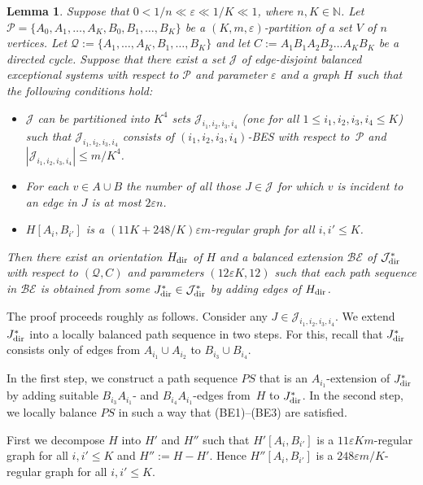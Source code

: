 \documentclass{memo-l}
\newtheorem{lemma}[firstthm]{Lemma}
\def\COMMENT#1{}
\def\proof{\removelastskip\penalty55\medskip\noindent{\bf Proof. }}
\def\cP{\mathcal{P}}
\def\eps{\varepsilon}
\def\i{(i_1,i_2,i_3,i_4)}
\def\I{i_1,i_2,i_3,i_4}
\numberwithin{section}{chapter}
\numberwithin{equation}{section}
\numberwithin{firstthm}{section}
\numberwithin{figure}{section}
\begin{document}
{\begin{lemma}\label{balanceextensionbip}
Suppose that $0<1/n \ll \eps  \ll 1/K \ll 1$,
where $n,K \in \mathbb N$.
Let $\cP=\{A_0,A_1,\dots,A_K,B_0,B_1,\dots,B_K\}$ be a $(K,m,\eps)$-partition of a set $V$ of $n$ vertices.
Let $\mathcal{Q} := \{A_1,\dots,A_K,B_1,\dots,B_K \}$ and let $C:= A_1B_1A_2B_2 \dots A_KB_K$ be a directed cycle. 
Suppose that there exist a set $\mathcal{J}$ of edge-disjoint balanced exceptional systems with respect to $\mathcal{P}$ and parameter $\eps$ and a graph $H$ such that the following conditions hold:
\begin{itemize}
\item[{\rm (i)}]  $\mathcal{J}$ can be partitioned into $K^4$ sets $\mathcal J_{\I}$ (one for all $1\le \I\le K$) such that $\mathcal J_{\I}$
consists of $\i$-BES with respect to~$\cP$ and $|\mathcal J_{\I}| \le m/K^4$.
\item[{\rm (ii)}] For each $v \in A \cup B$ the number of all those $J \in \mathcal{J}$ for which $v$ is incident to an edge in $J$ is at most $2 \eps n $.
\item[{\rm (iii)}] $H[A_{i},B_{i'}]$ is a $(11K+ 248/K)\eps m$-regular graph for all $i,i' \le K$.
\end{itemize}
Then there exist an orientation $H_{{\rm dir}}$ of $H$ and a balanced extension $\mathcal{BE}$ of $\mathcal{J}^*_{\rm dir}$ with respect to $(\mathcal{Q},C)$
and parameters $( 12 \eps K , 12)$ such that each path sequence in $\mathcal{BE}$ is obtained from some $J^*_{\rm dir}\in \mathcal{J}^*_{\rm dir}$
by adding edges of $H_{{\rm dir}}$.
\end{lemma}

The proof proceeds roughly as follows. Consider any $J \in \mathcal{J}_{\I}$.
We extend $J^*_{\rm dir}$ into a locally balanced path sequence in two steps.
For this, recall that $J^*_{\rm dir}$ consists only of edges from $A_{i_1} \cup A_{i_2}$ to $B_{i_3} \cup B_{i_4}$.%
    \COMMENT{Daniela: reworded}
In the first step, we construct a path sequence $PS$ that is an $A_{i_1}$-extension of $J^*_{\rm dir}$ by adding suitable $B_{i_3}A_{i_1}$- and $B_{i_4}A_{i_1}$-edges
from~$H$ to $J^*_{\rm dir}$. In the second step, we locally balance $PS$ in such a way that (BE1)--(BE3) are satisfied.%
    \COMMENT{Deryk: reworded}

\proof
First we decompose $H$ into $H'$ and $H''$ such that $H'[A_i,B_{i'}]$ is a $11 \eps K m$-regular graph for all $i,i' \le K$ and $H'' := H - H'$.
Hence $H''[A_i,B_{i'}]$ is a $248 \eps m/K$-regular graph for all $i,i' \le K$.

}
\end{document}
